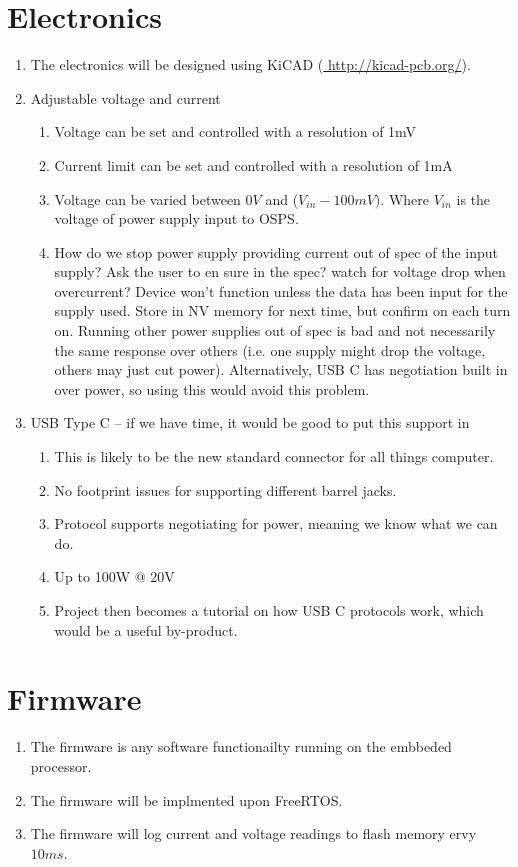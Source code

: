 \documentclass[12pt,a4paper]{article}
\begin{document}
\section{Electronics}
\begin{enumerate}[label*=\arabic*.]
\item The electronics will be designed using KiCAD (\url{ http://kicad-pcb.org/}).
\item Adjustable voltage and current
	\begin{enumerate}[label*=\arabic*.]
	\item Voltage can be set and controlled with a resolution of 1mV
	\item Current limit can be set and controlled with a resolution of 1mA
	\item Voltage can be varied between $0V$ and ($V_{in} - 100mV)$. Where $V_{in}$ is the voltage of power supply input to OSPS.
	\item How do we stop power supply providing current out of spec of the input supply? Ask the user to en sure in the spec? watch for voltage drop when overcurrent? Device won't 	function unless the data has been input for the supply used. Store in NV memory for next time, but confirm on each turn on. Running other power supplies out of spec is bad and not necessarily the same response over others (i.e. one supply might drop the voltage, others may just cut power). Alternatively, USB C has negotiation built in over power, so using this would avoid this problem. 
	\end{enumerate}
\item  USB Type C – if we have time, it would be good to put this support in
	\begin{enumerate}[label*=\arabic*.]
	\item This is likely to be the new standard connector for all things computer.
	\item No footprint issues for supporting different barrel jacks.
	\item Protocol supports negotiating for power, meaning we know what we can do. 
	\item Up to 100W @ 20V
	\item Project then becomes a tutorial on how USB C protocols work, which would be a useful by-product. 
	\end{enumerate}

\end{enumerate}


\section{Firmware}
\begin{enumerate}[label*=\arabic*.]
\item The firmware is any software functionailty running on the embbeded processor.
\item The firmware will be implmented upon FreeRTOS.
\item The firmware will log current and voltage readings to flash memory ervy $10ms$.
\end{enumerate}
\end{document}
